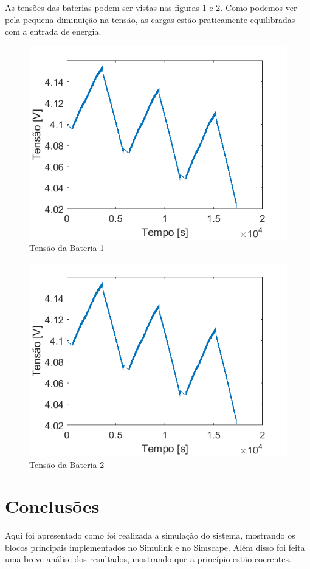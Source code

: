 As tensões das baterias podem ser vistas nas figuras \ref{figura_simulacao_tensao_bat1} e \ref{figura_simulacao_tensao_bat2}. Como podemos ver pela pequena diminuição na tensão, as cargas estão praticamente equilibradas com a entrada de energia.

\begin{figure}[!htpb]
\begin{center}
\includegraphics[scale=0.5]{figures/simulatedBatteryVoltage1.png}
\caption{Tensão da Bateria 1}
\label{figura_simulacao_tensao_bat1}
\end{center}
\end{figure}

\begin{figure}[!htpb]
\begin{center}
\includegraphics[scale=0.5]{figures/simulatedBatteryVoltage2.png}
\caption{Tensão da Bateria 2}
\label{figura_simulacao_tensao_bat2}
\end{center}
\end{figure}

\section{Conclusões}

Aqui foi apresentado como foi realizada a simulação do sistema, mostrando os blocos principais implementados no Simulink e no Simscape. Além disso foi feita uma breve análise dos resultados, mostrando que a princípio estão coerentes.